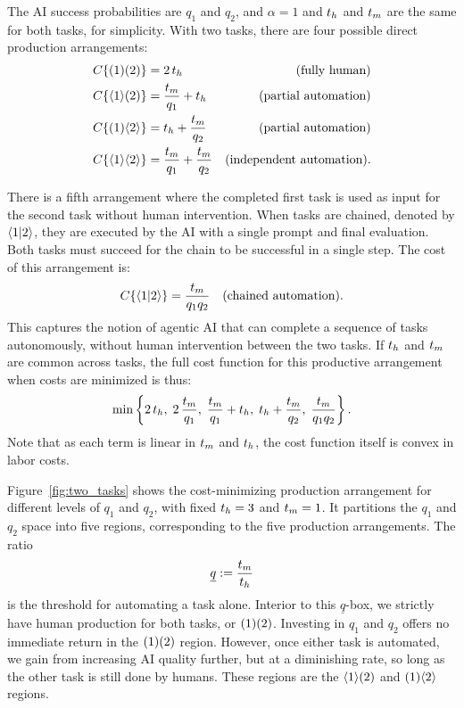 \documentclass{article}
\theoremstyle{plain}
\theoremstyle{plain}
\begin{document}
The AI success probabilities are \(q_1\) and \(q_2\), and $\alpha = 1$ and \(t_{h}\) and \(t_{m}\) are the same for both tasks, for simplicity.
With two tasks, there are four possible direct production arrangements:
\begin{align*}
    C\{ ( 1 )( 2 ) \} &= 2\,t_{h} & \text{(fully human)} \\
    C\{ \langle 1 \rangle( 2 ) \} &= \frac{t_{m}}{q_1} + t_{h} & \text{(partial automation)} \\
    C\{ ( 1 )\langle 2 \rangle \} &= t_{h} + \frac{t_{m}}{q_2} & \text{(partial automation)} \\
    C\{ \langle 1 \rangle\langle 2 \rangle \} &= \frac{t_{m}}{q_1} + \frac{t_{m}}{q_2} & \text{(independent automation)}.
\end{align*}

There is a fifth arrangement where the completed first task is used as input for the second task without human intervention.
When tasks are chained, denoted by $\langle 1|2 \rangle$, they are executed by the AI with a single prompt and final evaluation.
Both tasks must succeed for the chain to be successful in a single step.
The cost of this arrangement is:
\begin{align*}
C\{ \langle 1|2 \rangle \} &= \frac{t_{m}}{q_1 q_2} & \text{(chained automation)}.
\end{align*}
This captures the notion of agentic AI that can complete a sequence of tasks autonomously, without human intervention between the two tasks.
If \(t_{h}\) and \(t_{m}\) are common across tasks, the full cost function for this productive arrangement when costs are minimized is thus: 
\begin{align}
  \min \left\{2\,t_{h},\; 2\,\frac{t_{m}}{q_1},\; \frac{t_{m}}{q_1} + t_{h},\; t_{h} + \frac{t_{m}}{q_2},\; \frac{t_{m}}{q_1 q_2} \right\}.
\end{align}
Note that as each term is linear in \(t_{m}\) and \(t_{h}\), the cost function itself is convex in labor costs. 

Figure~\ref{fig:two_tasks} shows the cost-minimizing production arrangement for different levels of \(q_1\) and \(q_2\), with fixed \(t_{h} = 3\) and \(t_{m} = 1\).
It partitions the \(q_1\) and \(q_2\) space into five regions, corresponding to the five production arrangements.
The ratio 
\[
\underline{q} := \frac{t_{m}}{t_{h}}
\]
is the threshold for automating a task alone.
Interior to this \(\underline{q}\)-box, we strictly have human production for both tasks, or \(( 1 )( 2 )\).
Investing in \(q_1\) and \(q_2\) offers no immediate return in the \(( 1 )( 2 )\) region.
However, once either task is automated, we gain from increasing AI quality further, but at a diminishing rate, so long as the other task is still done by humans.
These regions are the \(\langle 1 \rangle( 2 )\) and \(( 1 )\langle 2 \rangle\) regions.
\end{document}
